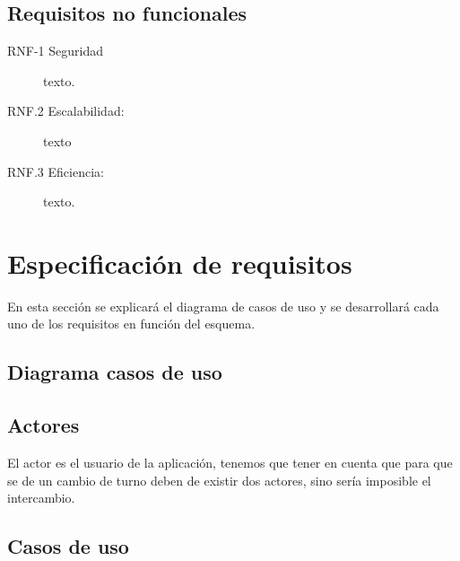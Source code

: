 \subsection{Requisitos no funcionales}\label{rnofuncionales}
\begin{description}
    \item [RNF-1 Seguridad] texto.
    \item [RNF.2 Escalabilidad:] texto
    \item [RNF.3 Eficiencia:]  texto.
\end{description}


\section{Especificación de requisitos}\label{requisitos}

En esta sección se explicará el diagrama de casos de uso y se desarrollará cada uno de los requisitos en función del esquema.

\subsection{Diagrama casos de uso}


\subsection{Actores}
El actor es el usuario de la aplicación, tenemos que tener en cuenta que para que se de un cambio de turno deben de existir dos actores, sino sería imposible el intercambio.

\subsection{Casos de uso}

